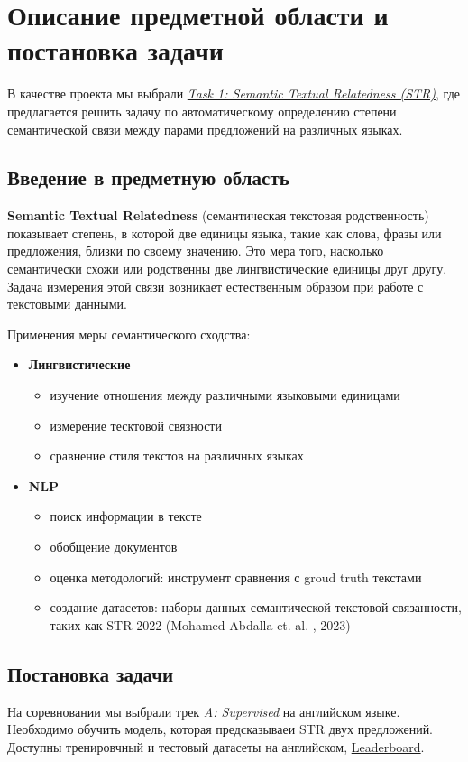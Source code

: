 \documentclass[12pt]{article}
\begin{document}
\tableofcontents
\newpage

\section{Описание предметной области и постановка задачи}
В качестве проекта мы выбрали \href{https://semantic-textual-relatedness.github.io/}{\textit{Task 1: Semantic Textual Relatedness (STR)}}, где предлагается решить задачу по автоматическому определению степени семантической связи между парами предложений на различных языках.

\subsection{Введение в предметную область}
\textbf{Semantic Textual Relatedness} (семантическая текстовая родственность) показывает степень, в которой две единицы языка, такие как слова, фразы или предложения, близки по своему значению. Это мера того, насколько семантически схожи или родственны две лингвистические единицы друг другу. Задача измерения этой связи возникает естественным образом при работе с текстовыми данными.

Применения меры семантического сходства:
\begin{itemize}
    \item \textbf{Лингвистические}
    \begin{itemize}
        \item изучение отношения между различными языковыми единицами
        \item измерение тесктовой связности
        \item сравнение стиля текстов на различных языках
    \end{itemize}

    \item \textbf{NLP}
    \begin{itemize}
        \item поиск информации в тексте
        \item обобщение документов
        \item оценка методологий: инструмент сравнения с groud truth текстами
        \item создание датасетов: наборы данных семантической текстовой связанности, таких как STR-2022 (Mohamed Abdalla et. al. , 2023)
    \end{itemize}
\end{itemize}

\subsection{Постановка задачи}
На соревновании мы выбрали трек \textit{A: Supervised} на английском языке. Необходимо обучить модель, которая предсказываеи STR двух предложений. Доступны тренировчный и тестовый датасеты на английском, \href{https://codalab.lisn.upsaclay.fr/competitions/15715#results}{Leaderboard}.
\end{document}
